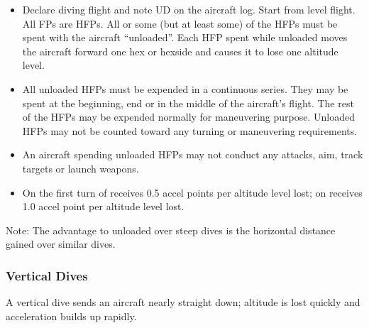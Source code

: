 \begin{itemize}

    \item{} Declare diving flight and note UD on the aircraft log. Start from level flight.  All FPs are HFPs. All or some (but at least some) of the HFPs must be spent with the aircraft “unloaded”. Each HFP spent while unloaded moves the aircraft forward one hex or hexside and causes it to lose one altitude level.

    \item{} All unloaded HFPs must be expended in a continuous series. They may be spent at the beginning, end or in the middle of the aircraft's flight. The rest of the HFPs may be expended normally for maneuvering purpose. Unloaded HFPs may not be counted toward any turning or maneuvering requirements.

    \item{} An aircraft spending unloaded HFPs may not conduct any attacks, aim, track targets or launch weapons. 

     \item{} On the first turn of  receives 0.5 accel points per altitude level lost; on  receives 1.0 accel point per altitude level lost.

\end{itemize}

Note: The advantage to unloaded over steep dives is the horizontal distance gained over similar dives.

\subsubsection{Vertical Dives}

A vertical dive sends an aircraft nearly straight down; altitude is lost quickly and acceleration builds up rapidly.

